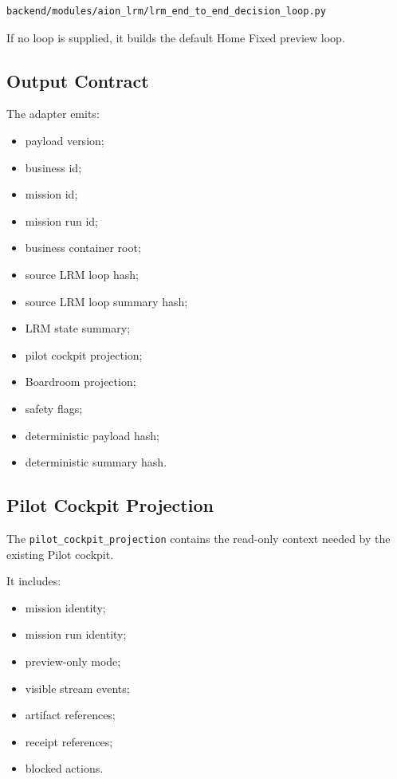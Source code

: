 \begin{verbatim}
backend/modules/aion_lrm/lrm_end_to_end_decision_loop.py
\end{verbatim}

If no loop is supplied, it builds the default Home Fixed preview loop.

\subsection{Output Contract}

The adapter emits:

\begin{itemize}
  \item payload version;
  \item business id;
  \item mission id;
  \item mission run id;
  \item business container root;
  \item source LRM loop hash;
  \item source LRM loop summary hash;
  \item LRM state summary;
  \item pilot cockpit projection;
  \item Boardroom projection;
  \item safety flags;
  \item deterministic payload hash;
  \item deterministic summary hash.
\end{itemize}

\subsection{Pilot Cockpit Projection}

The \texttt{pilot\_cockpit\_projection} contains the read-only context needed by the existing Pilot cockpit.

It includes:

\begin{itemize}
  \item mission identity;
  \item mission run identity;
  \item preview-only mode;
  \item visible stream events;
  \item artifact references;
  \item receipt references;
  \item blocked actions.
\end{itemize}

